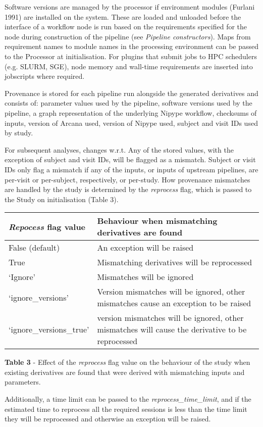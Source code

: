 Software versions are managed by the processor if environment modules
(Furlani 1991) are installed on the system. These are loaded and
unloaded before the interface of a workflow node is run based on the
requirements specified for the node during construction of the pipeline
(see \emph{Pipeline constructors}). Maps from requirement names to
module names in the processing environment can be passed to the
Processor at initialisation. For plugins that submit jobs to HPC
schedulers (e.g. SLURM, SGE), node memory and wall-time requirements are
inserted into jobscripts where required.

Provenance is stored for each pipeline run alongside the generated
derivatives and consists of: parameter values used by the pipeline,
software versions used by the pipeline, a graph representation of the
underlying Nipype workflow, checksums of inputs, version of Arcana used,
version of Nipype used, subject and visit IDs used by study.

For subsequent analyses, changes w.r.t. Any of the stored values, with
the exception of subject and visit IDs, will be flagged as a mismatch.
Subject or visit IDs only flag a mismatch if any of the inputs, or
inputs of upstream pipelines, are per-visit or per-subject,
respectively, or per-study. How provenance mismatches are handled by the
study is determined by the \emph{reprocess} flag, which is passed to the
Study on initialisation (Table 3).

\begin{longtable}[]{@{}ll@{}}
\toprule
\textbf{\emph{Repocess} flag value} & \textbf{Behaviour when mismatching
derivatives are found}\tabularnewline
\midrule
\endhead
False (default) & An exception will be raised\tabularnewline
True & Mismatching derivatives will be reprocessed\tabularnewline
`Ignore' & Mismatches will be ignored\tabularnewline
`ignore\_versions' & Version mismatches will be ignored, other
mismatches cause an exception to be raised\tabularnewline
`ignore\_versions\_true' & version mismatches will be ignored, other
mismatches will cause the derivative to be reprocessed\tabularnewline
\bottomrule
\end{longtable}

\textbf{Table 3} - Effect of the \emph{reprocess} flag value on the
behaviour of the study when existing derivatives are found that were
derived with mismatching inputs and parameters.

Additionally, a time limit can be passed to the
\emph{reprocess\_time\_limit}, and if the estimated time to reprocess
all the required sessions is less than the time limit they will be
reprocessed and otherwise an exception will be raised.

